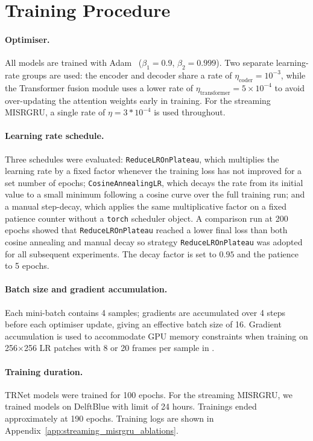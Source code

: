 \section{Training Procedure}
\label{sec:training}

\paragraph{Optimiser.}
All models are trained with Adam~\cite{kingma2014adam} ($\beta_1 = 0.9$, $\beta_2 = 0.999$).
Two separate learning-rate groups are used: the encoder and decoder share a rate of
$\eta_\text{coder} = 10^{-3}$, while the Transformer fusion module uses a lower rate of
$\eta_\text{transformer} = 5 \times 10^{-4}$ to avoid over-updating the attention weights
early in training.
For the streaming MISRGRU, a single rate of $\eta = 3*10^{-4}$ is used throughout.

\paragraph{Learning rate schedule.}
Three schedules were evaluated: \texttt{ReduceLROnPlateau}, which multiplies the
learning rate by a fixed factor whenever the training loss has not improved for a set number
of epochs; \texttt{CosineAnnealingLR}, which decays the rate from its initial
value to a small minimum following a cosine curve over the full training run; and a manual
step-decay, which applies the same multiplicative factor on a fixed patience
counter without a \texttt{torch} scheduler object.
A comparison run at 200 epochs showed that \texttt{ReduceLROnPlateau} reached a lower final
loss than both cosine annealing and manual decay so strategy \texttt{ReduceLROnPlateau} was adopted 
for all subsequent experiments.
The decay factor is set to $0.95$ and the patience to 5 epochs.

\paragraph{Batch size and gradient accumulation.}
Each mini-batch contains 4 samples; gradients are accumulated over 4 steps before each
optimiser update, giving an effective batch size of 16.
Gradient accumulation is used to accommodate GPU memory constraints when training on
256$\times$256 LR patches with 8 or 20 frames per sample in .

\paragraph{Training duration.}
TRNet models were trained for 100 epochs.
For the streaming MISRGRU, we trained models on DelftBlue with limit of 24 hours.
Trainings ended approximately at 190 epochs. Training logs are shown in 
Appendix~\ref{app:streaming_misrgru_ablations}.

